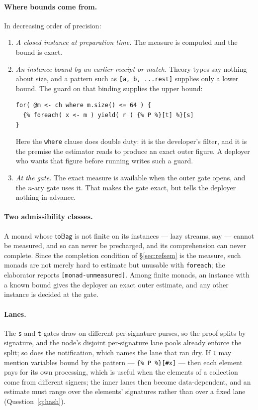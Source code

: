 \documentclass[11pt]{article}
\theoremstyle{branddef}
\theoremstyle{brandplain}
\theoremstyle{brandrem}
\newcommand{\fe}{\texttt{foreach}}
\begin{document}
\paragraph{Where bounds come from.} In decreasing order of precision:
\begin{enumerate}[nosep]
\item \emph{A closed instance at preparation time.} The measure is computed and
the bound is exact.
\item \emph{An instance bound by an earlier receipt or match.} Theory types say
nothing about size, and a pattern such as \verb|[a, b, ...rest]| supplies only
a lower bound. The guard on that binding supplies the upper bound:
\begin{lstlisting}
for( @m <- ch where m.size() <= 64 ) {
  {% foreach( x <- m ) yield( r ) {% P %}[t] %}[s]
}
\end{lstlisting}
Here the \texttt{where} clause does double duty: it is the developer's filter,
and it is the premise the estimator reads to produce an exact outer figure. A
deployer who wants that figure before running writes such a guard.
\item \emph{At the gate.} The exact measure is available when the outer gate
opens, and the \(n\)-ary gate uses it. That makes the gate exact, but tells the
deployer nothing in advance.
\end{enumerate}

\paragraph{Two admissibility classes.} A monad whose \(\mathsf{toBag}\) is not
finite on its instances --- lazy streams, say --- cannot be measured, and so can
never be precharged, and its comprehension can never complete. Since the
completion condition of \S\ref{sec:refsem} is the measure, such monads are not
merely hard to estimate but unusable with \fe{}; the elaborator reports
\texttt{[monad-unmeasured]}. Among finite monads, an instance with a known bound
gives the deployer an exact outer estimate, and any other instance is decided at
the gate.

\paragraph{Lanes.} The \texttt{s} and \texttt{t} gates draw on different
per-signature purses, so the proof splits by signature, and the node's disjoint
per-signature lane pools already enforce the split; so does the
notification, which names the lane that ran dry. If \texttt{t} may mention
variables bound by the pattern --- \verb|{% P %}[#x]| --- then each element pays
for its own processing, which is useful when the elements of a collection come
from different signers; the inner lanes then become data-dependent, and an
estimate must range over the elements' signatures rather than over a fixed lane
(Question~\ref{q:hash}).
\end{document}
